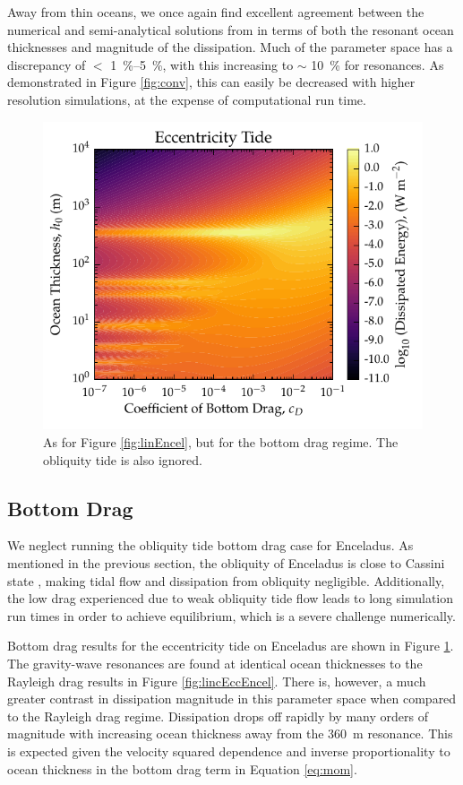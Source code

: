 Away from thin oceans, we once again find excellent agreement between the numerical and semi-analytical solutions from \citet{matsuyama2014tidal} in terms of both the resonant ocean thicknesses and magnitude of the dissipation. Much of the parameter space has a discrepancy of $<$ \SIrange{1}{5}{\percent}, with this increasing to $\sim$ \SI{10}{\percent} for resonances. As demonstrated in Figure \ref{fig:conv}, this can easily be decreased with higher resolution simulations, at the expense of computational run time.

\begin{figure}[!t]
    \centering
    \includegraphics[width=0.55\linewidth]{Figures/enceladus_bottom}
\caption{As for Figure \ref{fig:linEncel}, but for the bottom drag regime. The obliquity tide is also ignored. \label{fig:botEncel}}
\end{figure}

\subsection{Bottom Drag}

We neglect running the obliquity tide bottom drag case for Enceladus. As mentioned in the previous section, the obliquity of Enceladus is close to Cassini state \citep{chen2011obliquity,baland2016obliquity}, making tidal flow and dissipation from obliquity negligible. Additionally, the low drag experienced due to weak obliquity tide flow leads to long simulation run times in order to achieve equilibrium, which is a severe challenge numerically.

Bottom drag results for the eccentricity tide on Enceladus are shown in Figure \ref{fig:botEncel}. The gravity-wave resonances are found at identical ocean thicknesses to the Rayleigh drag results in Figure \ref{fig:lincEccEncel}. There is, however, a much greater contrast in dissipation magnitude in this parameter space when compared to the Rayleigh drag regime. Dissipation drops off rapidly by many orders of magnitude with increasing ocean thickness away from the \SI{360}{\metre} resonance. This is expected given the velocity squared dependence and inverse proportionality to ocean thickness in the bottom drag term in Equation \ref{eq:mom}. 

